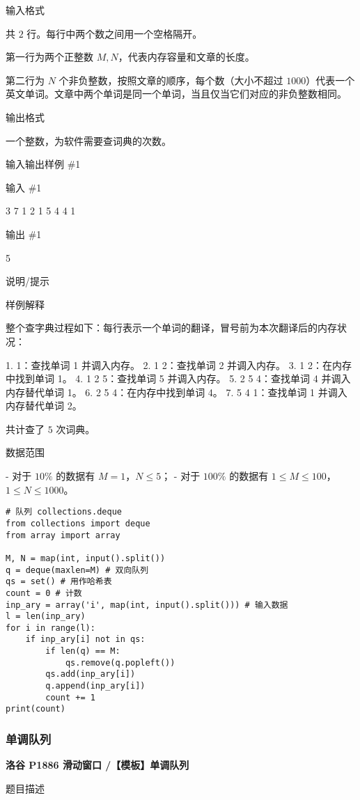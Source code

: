 \documentclass[../main]{subfiles}
\begin{document}
输入格式

共 $2$ 行。每行中两个数之间用一个空格隔开。

第一行为两个正整数 $M,N$，代表内存容量和文章的长度。

第二行为 $N$ 个非负整数，按照文章的顺序，每个数（大小不超过 $1000$）代表一个英文单词。文章中两个单词是同一个单词，当且仅当它们对应的非负整数相同。

输出格式

一个整数，为软件需要查词典的次数。

输入输出样例 \#1

输入 \#1

3 7
1 2 1 5 4 4 1

输出 \#1

5

说明/提示

样例解释

整个查字典过程如下：每行表示一个单词的翻译，冒号前为本次翻译后的内存状况：

1. 1：查找单词 1 并调入内存。
2. 1 2：查找单词 2 并调入内存。
3. 1 2：在内存中找到单词 1。
4. 1 2 5：查找单词 5 并调入内存。
5. 2 5 4：查找单词 4 并调入内存替代单词 1。
6. 2 5 4：在内存中找到单词 4。
7. 5 4 1：查找单词 1 并调入内存替代单词 2。

共计查了 $5$ 次词典。

数据范围

- 对于 $10\%$ 的数据有 $M=1$，$N \leq 5$；
- 对于 $100\%$ 的数据有 $1 \leq M \leq 100$，$1 \leq N \leq 1000$。


\begin{lstlisting}[style = Python]
# 队列 collections.deque
from collections import deque
from array import array

M, N = map(int, input().split())
q = deque(maxlen=M) # 双向队列
qs = set() # 用作哈希表
count = 0 # 计数
inp_ary = array('i', map(int, input().split())) # 输入数据
l = len(inp_ary)
for i in range(l):
    if inp_ary[i] not in qs:
        if len(q) == M:
            qs.remove(q.popleft())
        qs.add(inp_ary[i])
        q.append(inp_ary[i])
        count += 1
print(count)
\end{lstlisting}

\subsubsection{单调队列}

\textbf{洛谷 P1886 滑动窗口 /【模板】单调队列}

题目描述
\end{document}
